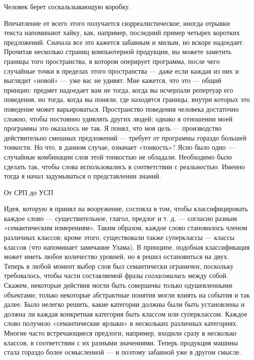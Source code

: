 Человек берет соскальзывающую коробку.

Впечатление от всего этого получается сюрреалистическое; иногда отрывки текста напоминают хайку, как, например, последний пример четырех коротких предложений. Сначала все это кажется забавным и милым, но вскоре надоедает. Прочитав несколько страниц компьютерной продукции, вы можете заметить границы того пространства, в котором оперирует программа, после чего случайные точки в пределах этого пространства --- даже если каждая из них и выглядит «новой» --- уже вас не удивят. Мне кажется, что это --- общий принцип: предмет надоедает вам не тогда, когда вы исчерпали репертуар его поведения, но тогда, когда вы поняли, где находятся границы, внутри которых это поведение может варьироваться. Пространство поведения человека достаточно сложно, чтобы постоянно удивлять других людей; однако в отношении моей программы это оказалось не так. Я понял, что моя цель --- производство действительно смешных предложений --- требует от программы гораздо большей тонкости. Но что, в данном случае, означает «тонкость»? Ясно было одно --- случайные комбинации слов этой тонкостью не обладали. Необходимо было сделать так, чтобы слова использовались в соответствии с реальностью. Именно тогда я начал задумываться о представлении знаний.

От СРП до УСП

Идея, которую я принял на вооружение, состояла в том, чтобы классифицировать каждое слово --- существительное, глагол, предлог и т. д. --- согласно разным «семантическим измерениям». Таким образом, каждое слово становилось членом различных классов; кроме этого, существовали также суперклассы --- классы классов (что напоминает замечание Улама). В принципе, подобная классификация может иметь любое количество уровней, но я решил остановиться на двух. Теперь в любой момент выбор слов был семантически ограничен, поскольку требовалось, чтобы части составляемой фразы \emph{согласовались} между собой. Скажем, некоторые действия могли быть совершены только одушевленными объектами; только некоторые абстрактные понятия могли влиять на события и так далее. Было нелегко решить, какие категории должны были быть установлены и должна ли каждая конкретная категория быть классом или суперклассом. Каждое слово получило «семантические ярлыки» в нескольких различных категориях. Многие часто встречающиеся предлоги, например, входили сразу в несколько классов, в соответствии с их разными значениями. Теперь продукция машины стала гораздо более осмысленной --- и поэтому забавной уже в другом смысле.

